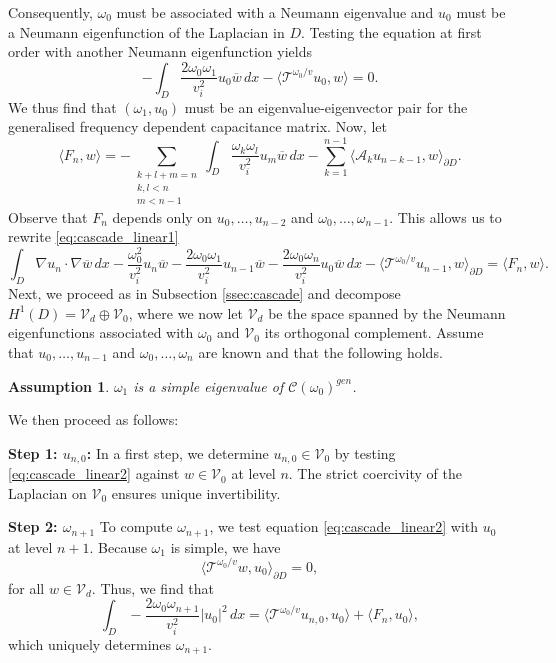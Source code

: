 \documentclass[a4paper,reqno,twoside]{amsart}
\numberwithin{equation}{section}
\newtheorem{assumption}{Assumption}
\theoremstyle{definition}
\newcommand{\<}{\ensuremath \leq}
\renewcommand{\>}{\ensuremath \geq}
\begin{document}
Consequently, $\omega_0$ must be associated with a Neumann eigenvalue and $u_0$ must be a Neumann eigenfunction of the Laplacian in $D$. Testing the equation at first order with another Neumann eigenfunction yields
\begin{equation}
    -\int_{D} \dfrac{2\omega_0\omega_1}{v_i^2}u_0 \overline{w} \, dx  -\langle \mathcal{T}^{\omega_0/v}u_0,w\rangle= 0.
\end{equation}
We thus find that $(\omega_1,u_0)$ must be an eigenvalue-eigenvector pair for the generalised frequency dependent capacitance matrix. Now, let
\begin{equation}\label{eq:cascade_linear1.5}
    \langle F_{n},w\rangle = 
    - \sum_{\substack{k + l + m = n \\ k,l< n\\m< n-1}}\int_D \dfrac{\omega_k\omega_l}{v_i^2} u_m \overline{w} \, dx - \sum_{k=1}^{n-1}\langle\mathcal{A}_k u_{n-k-1},w\rangle_{\partial D}.
\end{equation}
Observe that $F_{n}$ depends only on $u_0,\dots,u_{n-2}$ and $\omega_0,\dots,\omega_{n-1}$. This allows us to rewrite \eqref{eq:cascade_linear1}
\begin{equation}\label{eq:cascade_linear2}
    \int_{D} \nabla u_n \cdot \nabla \overline{w} \, dx 
    - \dfrac{\omega_0^2}{v_i^2}u_n\overline{w}- \dfrac{2\omega_0\omega_1}{v_i^2}u_{n-1}\overline{w} - \dfrac{2\omega_0\omega_n}{v_i^2}u_0\overline{w} \, dx - \langle\mathcal{T}^{\omega_0/v}u_{n-1},w\rangle_{\partial D} =  \langle F_{n},w\rangle.
\end{equation}
Next, we proceed as in Subsection \ref{ssec:cascade} and decompose $H^1(D) = \mathcal{V}_d\oplus\mathcal{V}_0$, where we now let $\mathcal{V}_d$ be the space spanned by the Neumann eigenfunctions associated with $\omega_0$ and $\mathcal{V}_0$ its orthogonal complement. Assume that $u_0,\dots,u_{n-1}$ and $\omega_0,\dots,\omega_{n}$ are known and that the following holds.
\begin{assumption}\label{as:simplicity}
    $\omega_1$ is a simple eigenvalue of $\mathcal{C}(\omega_0)^{gen}$.
\end{assumption}
We then proceed as follows:

\textbf{Step 1: $u_{n,0}$:} In a first step, we determine $u_{n,0} \in \mathcal{V}_0$ by testing \eqref{eq:cascade_linear2} against $w \in \mathcal{V}_0$ at level $n$. The strict coercivity of the Laplacian on $\mathcal{V}_0$ ensures unique invertibility.

\textbf{Step 2: $\omega_{n+1}$} To compute $\omega_{n+1}$, we test equation \eqref{eq:cascade_linear2} with $u_0$ at level $n+1$. Because $\omega_1$ is simple, we have 
\begin{equation}
    \langle \mathcal{T}^{\omega_0/v}w,u_0\rangle_{\partial D}=0,    
\end{equation}
for all $w \in \mathcal{V}_d$. Thus, we find that
\begin{equation}
    \int_{D}  - \dfrac{2\omega_0\omega_{n+1}}{v_i^2}\lvert u_0\rvert^2 \, dx =  \langle \mathcal{T}^{\omega_0/v}u_{n,0},u_0\rangle + \langle F_{n},u_0\rangle,
\end{equation}
which uniquely determines $\omega_{n+1}$.
\end{document}
